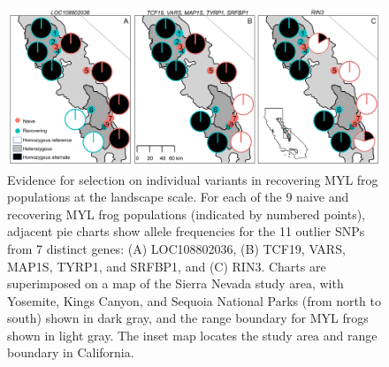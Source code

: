 \documentclass[9pt,twocolumn,twoside,lineno]{pnas-new}
\begin{document}
\showacknow{} %



\clearpage
\begin{figure}

{\centering \includegraphics[width=\textwidth]{figures/allele_maps.png}

}

\caption{\label{fig-allelefrequencies}Evidence for selection on
individual variants in recovering MYL frog populations at the landscape
scale. For each of the 9 naive and recovering MYL frog populations
(indicated by numbered points), adjacent pie charts show allele
frequencies for the 11 outlier SNPs from 7 distinct genes: (A)
LOC108802036, (B) TCF19, VARS, MAP1S, TYRP1, and SRFBP1, and (C) RIN3.
Charts are superimposed on a map of the Sierra Nevada study area, with
Yosemite, Kings Canyon, and Sequoia National Parks (from north to south)
shown in dark gray, and the range boundary for MYL frogs shown in light
gray. The inset map locates the study area and range boundary in
California.}

\end{figure}

\newpage
\end{document}
